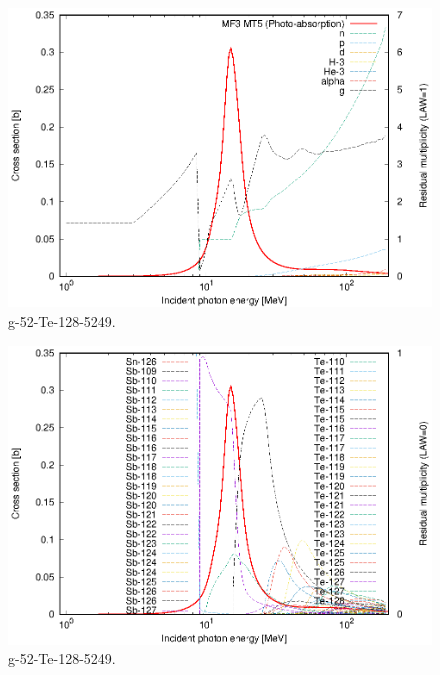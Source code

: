 \begin{figure}
 \includegraphics[width=\linewidth]{eps/g_52-Te-128_5249.eps}
  \caption{g-52-Te-128-5249.}
\end{figure}
\begin{figure}
 \includegraphics[width=\linewidth]{eps-law0/g_52-Te-128_5249.eps}
 \caption{g-52-Te-128-5249.}
\end{figure}
\newpage \clearpage

